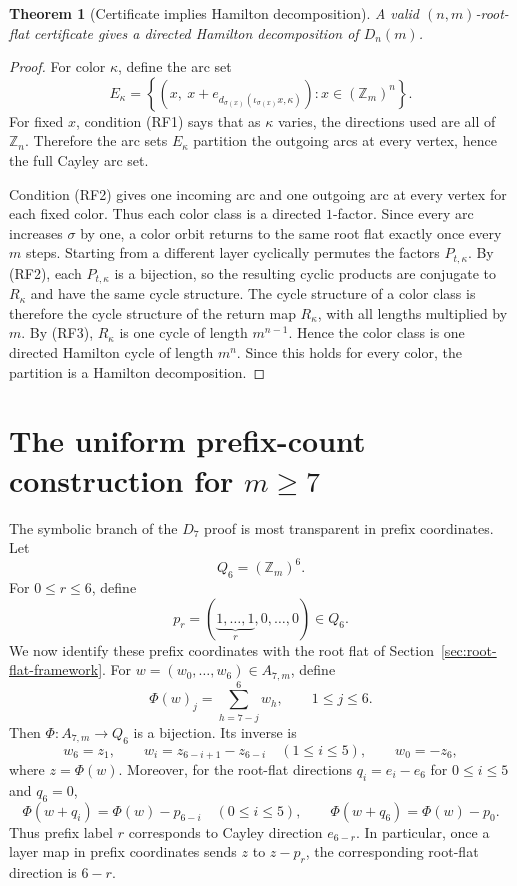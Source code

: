 \documentclass[11pt]{article}
\newtheorem{theorem}{Theorem}
\theoremstyle{definition}
\begin{document}
\begin{theorem}[Certificate implies Hamilton decomposition]\label{thm:certificate-implies}
A valid \((n,m)\)-root-flat certificate gives a directed Hamilton decomposition of \(D_n(m)\).
\end{theorem}

\begin{proof}
For color \(\kappa\), define the arc set
\[
E_\kappa=
\left\{\left(x,\ x+e_{d_{\sigma(x)}(\iota_{\sigma(x)}x,\kappa)}\right):x\in(\mathbb Z_m)^n\right\}.
\]
For fixed \(x\), condition (RF1) says that as \(\kappa\) varies, the directions used are all of
\(\mathbb Z_n\).  Therefore the arc sets \(E_\kappa\) partition the outgoing arcs at every vertex,
hence the full Cayley arc set.

Condition (RF2) gives one incoming arc and one outgoing arc at every vertex for each fixed color.
Thus each color class is a directed \(1\)-factor.  Since every arc increases \(\sigma\) by one, a color
orbit returns to the same root flat exactly once every \(m\) steps.  Starting from a different layer cyclically permutes the factors \(P_{t,\kappa}\).  By (RF2), each \(P_{t,\kappa}\) is a bijection, so the resulting cyclic products are conjugate to \(R_\kappa\) and have the same cycle structure.  The cycle structure of a color
class is therefore the cycle structure of the return map \(R_\kappa\), with all lengths multiplied by
\(m\).  By (RF3), \(R_\kappa\) is one cycle of length \(m^{n-1}\).  Hence the color class is one
directed Hamilton cycle of length \(m^n\).  Since this holds for every color, the partition is a
Hamilton decomposition.
\end{proof}

\section{The uniform prefix-count construction for \texorpdfstring{\(m\ge7\)}{m>=7}}\label{sec:prefix-count}

The symbolic branch of the \(D_7\) proof is most transparent in prefix coordinates.  Let
\[
Q_6=(\mathbb Z_m)^6.
\]
For \(0\le r\le6\), define
\[
p_r=(\underbrace{1,\ldots,1}_r,0,\ldots,0)\in Q_6.
\]
We now identify these prefix coordinates with the root flat of Section~\ref{sec:root-flat-framework}.  For
\(w=(w_0,\ldots,w_6)\in A_{7,m}\), define
\[
\Phi(w)_j=\sum_{h=7-j}^{6}w_h,
\qquad 1\le j\le6.
\]
Then \(\Phi:A_{7,m}\to Q_6\) is a bijection.  Its inverse is
\[
w_6=z_1,
\qquad w_i=z_{6-i+1}-z_{6-i}\quad(1\le i\le5),
\qquad w_0=-z_6,
\]
where \(z=\Phi(w)\).  Moreover, for the root-flat directions \(q_i=e_i-e_6\) for \(0\le i\le5\) and \(q_6=0\),
\[
\Phi(w+q_i)=\Phi(w)-p_{6-i}\quad(0\le i\le5),
\qquad
\Phi(w+q_6)=\Phi(w)-p_0.
\]
Thus prefix label \(r\) corresponds to Cayley direction \(e_{6-r}\).  In particular, once a layer map in prefix coordinates sends \(z\) to \(z-p_r\), the corresponding root-flat direction is \(6-r\).
\end{document}
